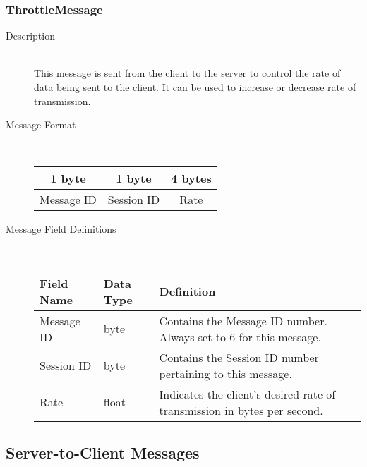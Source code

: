 \documentclass[12pt,letterpaper,titlepage]{article}
\begin{document}
\subsubsection{ThrottleMessage}
	\begin{description}
	\item[Description] \hfill \\
		This message is sent from the client to the server to control the rate of data being sent to the client. It can be used to increase or decrease rate of transmission.
	\item[Message Format] \hfill \\
	\begin{tabular}{ | c | c | c | }
		\hline
		1 byte & 1 byte & 4 bytes \\
		\hline
		Message ID & Session ID & Rate \\
		\hline
	\end{tabular}
	\item[Message Field Definitions] \hfill \\
	\begin{tabular}{ | p{3cm} | p{1cm} | p{8cm} | }
		\hline
		Field Name & Data Type & Definition \\
		\hline
		Message ID & byte & Contains the Message ID number. 
					\newline Always set to 6 for this message. \\
		\hline
		Session ID & byte & Contains the Session ID number pertaining to this message. \\
		\hline
        Rate & float & Indicates the client's desired rate of transmission in bytes per second. \\
        \hline
	\end{tabular}
	\end{description}

\subsection{Server-to-Client Messages}
\end{document}
